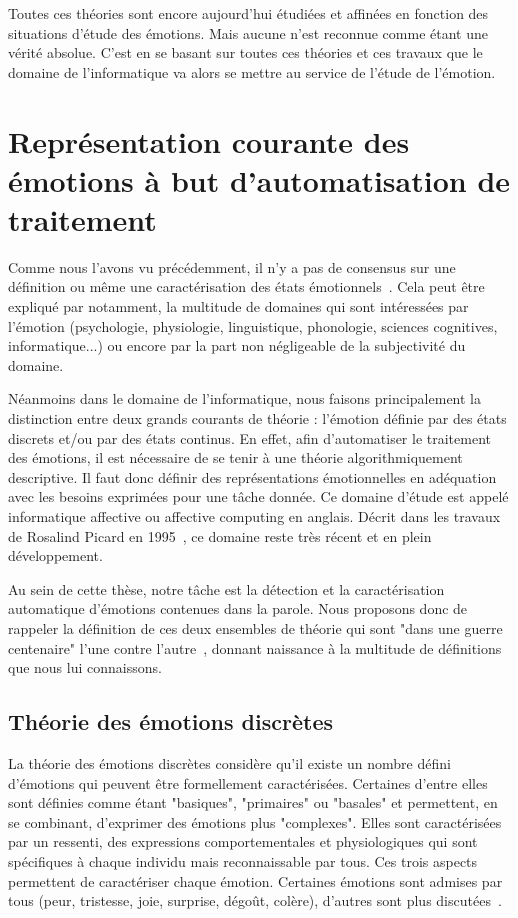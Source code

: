Toutes ces théories sont encore aujourd'hui étudiées et affinées en fonction des situations d'étude des émotions. Mais aucune n'est reconnue comme étant une vérité absolue. C'est en se basant sur toutes ces théories et ces travaux que le domaine de l'informatique va alors se mettre au service de l'étude de l'émotion.


\section{Représentation courante des émotions à but d'automatisation de traitement}
Comme nous l'avons vu précédemment, il n'y a pas de consensus sur une définition ou même une caractérisation des états émotionnels~\cite{Kleinginna1981}. Cela peut être expliqué par notamment, la multitude de domaines qui sont intéressées par l'émotion (psychologie, physiologie, linguistique, phonologie, sciences cognitives, informatique...) ou encore par la part non négligeable de la subjectivité du domaine.

Néanmoins dans le domaine de l'informatique, nous faisons principalement la distinction entre deux grands courants de théorie : l'émotion définie par des états discrets et/ou par des états continus. En effet, afin d'automatiser le traitement des émotions, il est nécessaire de se tenir à une théorie algorithmiquement descriptive. Il faut donc définir des représentations émotionnelles en adéquation avec les besoins exprimées pour une tâche donnée. Ce domaine d'étude est appelé informatique affective ou affective computing en anglais. Décrit dans les travaux de Rosalind Picard en 1995~\cite{Picard2000}, ce domaine reste très récent et en plein développement.

Au sein de cette thèse, notre tâche est la détection et la caractérisation automatique d'émotions contenues dans la parole. Nous proposons donc de rappeler la définition de ces deux ensembles de théorie qui sont "dans une guerre centenaire" l'une contre l'autre~\cite{Lindquist2013}, donnant naissance à la multitude de définitions que nous lui connaissons.

\subsection{Théorie des émotions discrètes}
La théorie des émotions discrètes considère qu'il existe un nombre défini d'émotions qui peuvent être formellement caractérisées. Certaines d'entre elles sont définies comme étant "basiques", "primaires" ou "basales" et permettent, en se combinant, d'exprimer des émotions plus "complexes". Elles sont caractérisées par un ressenti, des expressions comportementales et physiologiques qui sont spécifiques à chaque individu mais reconnaissable par tous. Ces trois aspects permettent de caractériser chaque émotion. Certaines émotions sont admises par tous (peur, tristesse, joie, surprise, dégoût, colère), d'autres sont plus discutées~\cite{Cosnier1994}.

